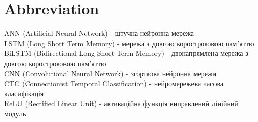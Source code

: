\chapter*{Abbreviation}							%


ANN (Artificial  Neural Network) - штучна нейронна мережа \\
LSTM (Long Short Term Memory) - мережа з довгою коростроковою пам’яттю \\
BiLSTM (Bidirectional Long Short Term Memory) - двонапрямлена мережа з довгою коростроковою пам’яттю \\
CNN (Convolutional Neural Network) - згорткова нейронна мережа \\
CTC (Connectionist Temporal Classification) - нейромережева часова класифікація  \\
ReLU (Rectified Linear Unit) - активаційна функція виправлений лінійний модуль \\





